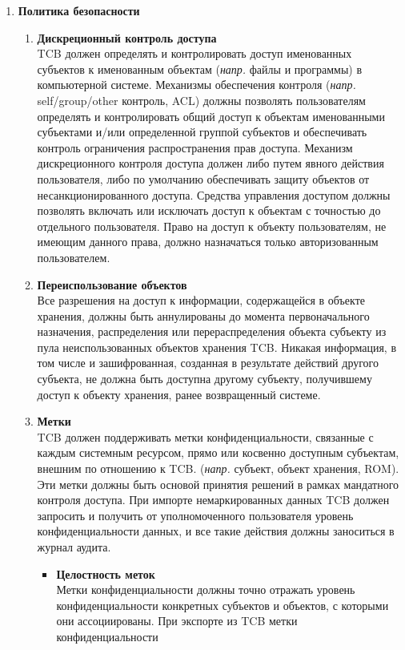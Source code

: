 \begin{enumerate}
\begin{enumerate}
		\begin{enumerate}
			\item{\textbf{Политика безопасности}}
			\begin{enumerate}
				\item{\textbf{Дискреционный контроль доступа}}\\
				TCB должен определять и контролировать доступ именованных субъектов к именованным объектам (\textit{напр.} файлы и программы) в компьютерной системе. Механизмы обеспечения контроля
				(\textit{напр.} self/group/other контроль, ACL) должны позволять пользователям определять и контролировать общий доступ к объектам именованными субъектами и/или определенной группой
				субъектов и обеспечивать контроль ограничения распространения прав доступа. Механизм дискреционного контроля доступа должен либо путем явного действия пользователя, либо по умолчанию
				обеспечивать защиту объектов от несанкционированного доступа. Средства управления доступом должны позволять включать или исключать доступ к объектам с точностью до отдельного
				пользователя. Право на доступ к объекту пользователям, не имеющим данного права, должно назначаться только авторизованным пользователем.
				\item{\textbf{Переиспользование объектов}}\\
				Все разрешения на доступ к информации, содержащейся в объекте хранения, должны быть аннулированы до момента первоначального назначения, распределения или перераспределения объекта
				субъекту из пула неиспользованных объектов хранения TCB. Никакая информация, в том числе и зашифрованная, созданная в результате действий другого субъекта, не должна быть доступна
				другому субъекту, получившему доступ к объекту хранения, ранее возвращенный системе.
				\item{\textbf{Метки}}\\
				TCB должен поддерживать метки конфиденциальности, связанные с каждым системным ресурсом, прямо или косвенно доступным субъектам, внешним по отношению к TCB. (\textit{напр.} субъект,
				объект хранения, ROM). Эти метки должны быть основой принятия решений в рамках мандатного контроля доступа. При импорте немаркированных данных TCB должен запросить и получить от
				уполномоченного пользователя уровень конфиденциальности данных, и все такие действия должны заноситься в журнал аудита.
				\begin{itemize}
					\item{\textbf{Целостность меток}}\\
					Метки конфиденциальности должны точно отражать уровень конфиденциальности конкретных субъектов и объектов, с которыми они ассоциированы. При экспорте из TCB метки конфиденциальности

\end{itemize}
\end{enumerate}
\end{enumerate}
\end{enumerate}
\end{enumerate}
